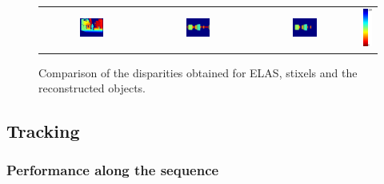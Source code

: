 \begin{figure}[h!]
\begin{tabular}{cccc}
\includegraphics[width=0.25\textwidth]{elas}\label{fig:cp04_reconstruction_elas} & 
\includegraphics[width=0.25\textwidth]{stixels}\label{fig:cp04_reconstruction_stixels} & 
\includegraphics[width=0.25\textwidth]{objects}\label{fig:cp04_reconstruction_objects} &
\includegraphics[height=0.1875\textwidth]{colorscale_jet}\label{fig:cp04_reconstruction_colorscale} %
\end{tabular}
\caption{Comparison of the disparities obtained for \ac{ELAS}, stixels and the reconstructed objects.}\label{fig:cp04_reconstruction}
\end{figure}

\subsection{Tracking}\label{ch:chapter04_06_03}

\subsubsection{Performance along the sequence}\label{ch:chapter04_06_03_01}

